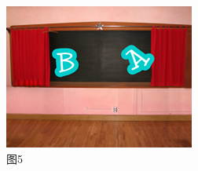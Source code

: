 \documentclass[10pt, a4paper]{article}
\begin{document}
\begin{enumerate}
\begin{figure}[htbp]
\begin{minipage}[t]{.18\textwidth}
                \includegraphics[width=\textwidth]{37-5.png}
                \caption*{图5}
            \end{minipage}
        \end{figure}
    \end{enumerate}
\end{document}
